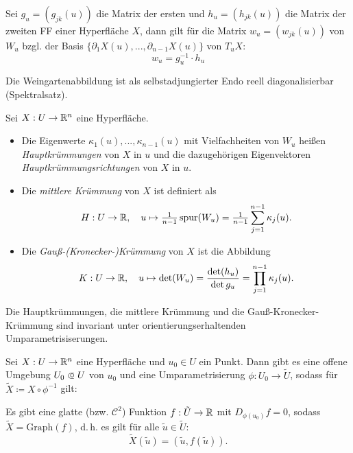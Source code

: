 \documentclass{cheat-sheet}
\newcommand{\spur}{\mathrm{spur}}
\newcommand{\Graph}{\mathrm{Graph}}
\newcommand\opn{\mathrel{\ooalign{$\subset$\cr
  \hidewidth\raise.1ex\hbox{$\circ\mkern.5mu$}\cr}}}
\begin{document}
\begin{satz}
  Sei $g_u = (g_{jk}(u))$ die Matrix der ersten und $h_u = (h_{jk}(u))$ die Matrix der zweiten FF einer Hyperfläche $X$, dann gilt für die Matrix $w_u = (w_{jk}(u))$ von $W_u$ bzgl. der Basis $\{ \partial_1 X(u), ..., \partial_{n-1} X(u) \}$ von $T_u X$:
  \[ w_u = g_u^{-1} \cdot h_u \]
\end{satz}

\begin{bem}
  Die Weingartenabbildung ist als selbstadjungierter Endo reell diagonalisierbar (Spektralsatz).
\end{bem}

\begin{defn}
  Sei $X : U \to \mathbb{R}^n$ eine Hyperfläche.
  \begin{itemize}
    \item Die Eigenwerte $\kappa_1(u), ..., \kappa_{n-1}(u)$ mit Vielfachheiten von $W_u$ heißen \emph{Hauptkrümmungen} von $X$ in $u$ und die dazugehörigen Eigenvektoren \emph{Hauptkrümmungsrichtungen} von $X$ in $u$.
    \item Die \emph{mittlere Krümmung} von $X$ ist definiert als
    \[ H : U \to \R, \quad u \mapsto \tfrac{1}{n-1} \, \spur(W_u) = \tfrac{1}{n-1} \sum_{j=1}^{n-1} \kappa_j(u). \]
    \item Die \emph{Gauß-(Kronecker-)Krümmung} von $X$ ist die Abbildung
    \[ K : U \to \mathbb{R}, \quad u \mapsto \det(W_u) = \frac{\det(h_u)}{\det{g_u}} = \prod_{j=1}^{n-1} \kappa_j(u). \]
  \end{itemize}
\end{defn}

\begin{satz}
  Die Hauptkrümmungen, die mittlere Krümmung und die Gauß-Kronecker-Krümmung sind invariant unter orientierungserhaltenden Umparametrisiserungen.
\end{satz}


\begin{satz}
  Sei $X : U \to \mathbb{R}^n$ eine Hyperfläche und $u_0 \in U$ ein Punkt. Dann gibt es eine offene Umgebung $U_0 \opn U$ von $u_0$ und eine Umparametrisierung $\phi : U_0 \to \tilde{U}$, sodass für $\tilde{X} \coloneqq X \circ \phi^{-1}$ gilt:

  Es gibt eine glatte (bzw. $\mathcal{C}^2$) Funktion $f : \tilde{U} \to \mathbb{R}$ mit $D_{\phi(u_0)} f = 0$, sodass $\tilde{X} = \Graph(f)$, d.\,h. es gilt für alle $\tilde{u} \in \tilde{U}$:
  \[ \tilde{X}(\tilde{u}) = (\tilde{u}, f(\tilde{u})). \]
\end{satz}
\end{document}
